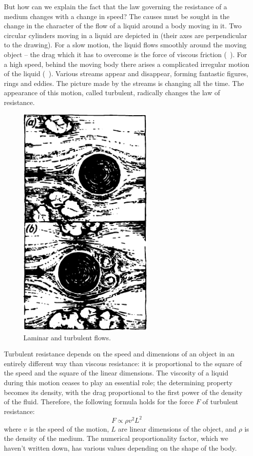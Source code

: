 But how can we explain the fact that the law governing the resistance of a medium changes with a change in speed? The causes must be sought in the change in the character of the flow of a liquid around a body moving in it. Two circular cylinders moving in a liquid are de­picted in  (their axes are perpendicular to the drawing). For a slow motion, the liquid flows smoothly around the moving object -- the drag which it has to overcome is the force of viscous friction (~). For a high speed, behind the moving body there arises a complicated irregular motion of the liquid (~). Var­ious streams appear and disappear, forming fantastic figures, rings and eddies. The picture made by the streams is changing all the time. The appearance of this motion, called turbulent, radically changes the law of resistance.
\begin{figure}[!ht]
\centering
\includegraphics[width=0.6\textwidth]{figures/fig-06-03.pdf}
\caption{Laminar and turbulent flows.}
\label{fig-6.3}
\end{figure}

Turbulent resistance depends on the speed and dimen­sions of an object in an entirely different way than vis­cous resistance: it is proportional to the square of the speed and the square of the linear dimensions. The vis­cosity of a liquid during this motion ceases to play an essential role; the determining property becomes its density, with the drag proportional to the first power of the density of the fluid. Therefore, the following formula holds for the force $F$ of turbulent resistance:
\begin{equation*}%
F \propto \rho v^{2} L^{2}
\end{equation*}
where $v$ is the speed of the motion, $L$ are linear dimensions of the object, and $\rho$ is the density of the medium. The numerical proportionality factor, which we haven’t written down, has various values depending on the shape of the body.


